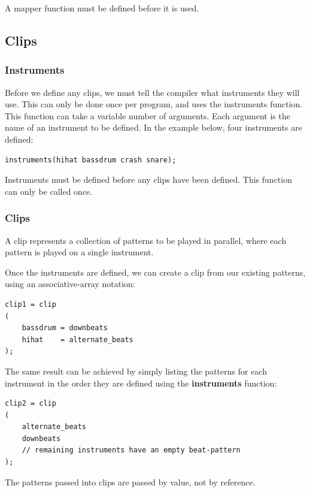 \documentclass[11pt,twoside]{article}
\begin{document}
A mapper function must be defined before it is used.





\subsection{Clips}

\subsubsection{Instruments}

Before we define any clips, we must tell the compiler what instruments they will use.
This can only be done once per program, and uses the instruments function.  This function can take a variable number of arguments.  Each argument is the name of an instrument to be defined.  In the example below, four instruments are defined:

\begin{verbatim}
instruments(hihat bassdrum crash snare);
\end{verbatim}

Instruments must be defined before any clips have been defined. This function 
can only be called once.

\subsubsection{Clips}

A clip represents a collection of patterns to be played in parallel, where each pattern is played on a single instrument.

Once the instruments are defined, we can create a clip from our existing patterns, using an
associative-array notation:

\begin{verbatim}
clip1 = clip
(
    bassdrum = downbeats
    hihat    = alternate_beats
);
\end{verbatim}
The same result can be achieved by simply listing the patterns for each instrument in the order they are defined using the \textbf{instruments} function:
\begin{verbatim}
clip2 = clip
(
    alternate_beats
    downbeats
    // remaining instruments have an empty beat-pattern
);

\end{verbatim}
The patterns passed into clips are passed by value, not by reference.
\end{document}
